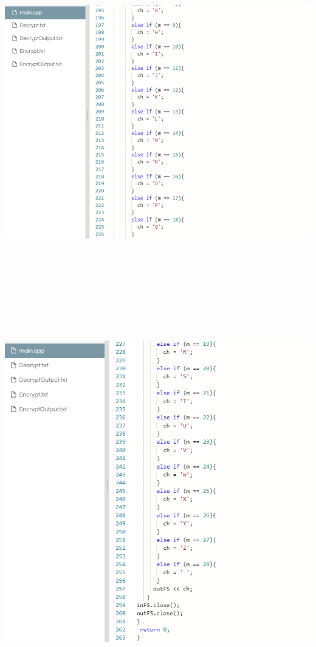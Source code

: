 \documentclass{article}
\begin{document}
\begin{solution}
\includegraphics[width=16cm, height=16cm]{7a.png}\\
\includegraphics[width=16cm, height=16cm]{8a.png}\\

\end{solution}
\end{document}
